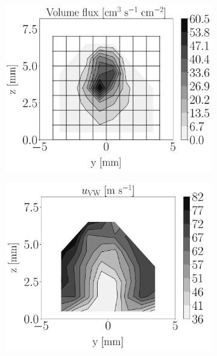 \begin{figure}[ht]
\vspace*{-0.20in}

\flushleft
\begin{subfigure}[b]{0.2\textwidth}
	\flushleft
	\hspace*{-0.45in}
   \includegraphics[scale=0.19]{./part2_developments/figures_ch6_lagrangian_JICF/injectors_SLI/uG100_dx10_x05_volume_flux_map}
\end{subfigure}
\hspace*{0.075in}
\begin{subfigure}[b]{0.2\textwidth}
	\flushleft
   \includegraphics[scale=0.19]{./part2_developments/figures_ch6_lagrangian_JICF/injectors_SLI/uG100_dx10_x05_ux_mean_vw_map}

\end{subfigure}
\end{figure}
